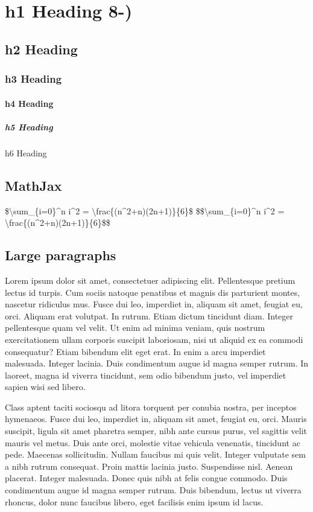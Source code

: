 \documentclass[]{article}
\date{}
\let\oldparagraph\paragraph
\renewcommand{\paragraph}[1]{\oldparagraph{#1}\mbox{}}
\let\oldsubparagraph\subparagraph
\renewcommand{\subparagraph}[1]{\oldsubparagraph{#1}\mbox{}}
\begin{document}
\section{h1 Heading 8-)}

\subsection{h2 Heading}

\subsubsection{h3 Heading}

\paragraph{h4 Heading}

\subparagraph{h5 Heading}

h6 Heading

\subsection{MathJax}

\$\textbackslash{}sum\_\{i=0\}\^{}n i\^{}2 =
\textbackslash{}frac\{(n\^{}2+n)(2n+1)\}\{6\}\$
\$\$\textbackslash{}sum\_\{i=0\}\^{}n i\^{}2 =
\textbackslash{}frac\{(n\^{}2+n)(2n+1)\}\{6\}\$\$

\subsection{Large paragraphs}

Lorem ipsum dolor sit amet, consectetuer adipiscing elit. Pellentesque
pretium lectus id turpis. Cum sociis natoque penatibus et magnis dis
parturient montes, nascetur ridiculus mus. Fusce dui leo, imperdiet in,
aliquam sit amet, feugiat eu, orci. Aliquam erat volutpat. In rutrum.
Etiam dictum tincidunt diam. Integer pellentesque quam vel velit. Ut
enim ad minima veniam, quis nostrum exercitationem ullam corporis
suscipit laboriosam, nisi ut aliquid ex ea commodi consequatur? Etiam
bibendum elit eget erat. In enim a arcu imperdiet malesuada. Integer
lacinia. Duis condimentum augue id magna semper rutrum. In laoreet,
magna id viverra tincidunt, sem odio bibendum justo, vel imperdiet
sapien wisi sed libero.

Class aptent taciti sociosqu ad litora torquent per conubia nostra, per
inceptos hymenaeos. Fusce dui leo, imperdiet in, aliquam sit amet,
feugiat eu, orci. Mauris suscipit, ligula sit amet pharetra semper, nibh
ante cursus purus, vel sagittis velit mauris vel metus. Duis ante orci,
molestie vitae vehicula venenatis, tincidunt ac pede. Maecenas
sollicitudin. Nullam faucibus mi quis velit. Integer vulputate sem a
nibh rutrum consequat. Proin mattis lacinia justo. Suspendisse nisl.
Aenean placerat. Integer malesuada. Donec quis nibh at felis congue
commodo. Duis condimentum augue id magna semper rutrum. Duis bibendum,
lectus ut viverra rhoncus, dolor nunc faucibus libero, eget facilisis
enim ipsum id lacus.
\end{document}
